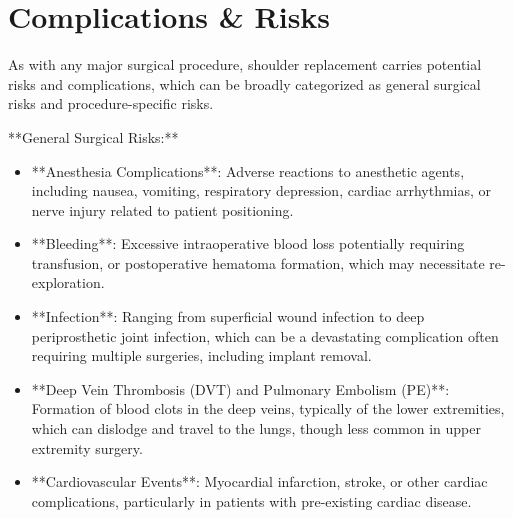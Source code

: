 \section*{Complications \& Risks}
As with any major surgical procedure, shoulder replacement carries potential risks and complications, which can be broadly categorized as general surgical risks and procedure-specific risks.

**General Surgical Risks:**
\begin{itemize}
  \item **Anesthesia Complications**: Adverse reactions to anesthetic agents, including nausea, vomiting, respiratory depression, cardiac arrhythmias, or nerve injury related to patient positioning.
  \item **Bleeding**: Excessive intraoperative blood loss potentially requiring transfusion, or postoperative hematoma formation, which may necessitate re-exploration.
  \item **Infection**: Ranging from superficial wound infection to deep periprosthetic joint infection, which can be a devastating complication often requiring multiple surgeries, including implant removal.
  \item **Deep Vein Thrombosis (DVT) and Pulmonary Embolism (PE)**: Formation of blood clots in the deep veins, typically of the lower extremities, which can dislodge and travel to the lungs, though less common in upper extremity surgery.
  \item **Cardiovascular Events**: Myocardial infarction, stroke, or other cardiac complications, particularly in patients with pre-existing cardiac disease.
\end{itemize}


